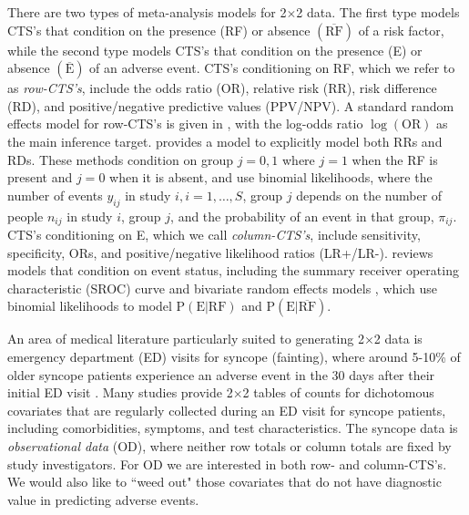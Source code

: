 \documentclass[AMA,STIX1COL]{WileyNJD-v2}
\newcommand{\E}{\mbox{E}}
\newcommand{\RF}{\mbox{RF}}
\newcommand{\Ebar}{\overline{\mbox{E}}}
\newcommand{\RFbar}{\overline{\mbox{RF}}}
\begin{document}
There are two types of meta-analysis models for 2$\times$2 data. The first type models CTS's that condition on the presence (RF) or absence $(\RFbar)$ of a risk factor, while the second type models CTS's that condition on the presence (E) or absence $(\Ebar)$ of an adverse event. CTS's conditioning on RF, which we refer to as \textit{row-CTS's}, include the odds ratio (OR), relative risk (RR), risk difference (RD), and positive/negative predictive values (PPV/NPV). A standard random effects model for row-CTS's is given in \citet{smith1995}, with the log-odds ratio $\log(\mbox{OR})$ as the main inference target. \citet{warn2002} provides a model to explicitly model both RRs and RDs. These methods condition on group $j = 0, 1$ where $j=1$ when the RF is present and $j=0$ when it is absent, and use binomial likelihoods, where the number of events $y_{ij}$ in study $i, i = 1, \dots, S$, group $j$ depends on the number of people $n_{ij}$ in study $i$, group $j$, and the probability of an event in that group, $\pi_{ij}$. CTS's conditioning on E, which we call \textit{column-CTS's}, include sensitivity, specificity, ORs, and positive/negative likelihood ratios (LR+/LR-). \citet{ma2016} reviews models that condition on event status, including the summary receiver operating characteristic (SROC) curve \citep{rutter2001, moses1993} and bivariate random effects models \citep{reitsma2005, chu2006, arends2008}, which use binomial likelihoods to model $\mbox{P}(\E \vert \RF)$ and $\mbox{P}(\E \vert \RFbar)$. 

An area of medical literature particularly suited to generating 2$\times$2 data is emergency department (ED) visits for syncope (fainting), where around 5-10\% of older syncope patients experience an adverse event in the 30 days after their initial ED visit \citep{gibson2018}. Many studies provide 2$\times$2 tables of counts for dichotomous covariates that are regularly collected during an ED visit for syncope patients, including comorbidities, symptoms, and test characteristics. The syncope data is \textit{observational data} (OD), where neither row totals or column totals are fixed by study investigators. For OD we are interested in both row- and column-CTS's. We would also like to ``weed out" those covariates that do not have diagnostic value in predicting adverse events. 
\end{document}
